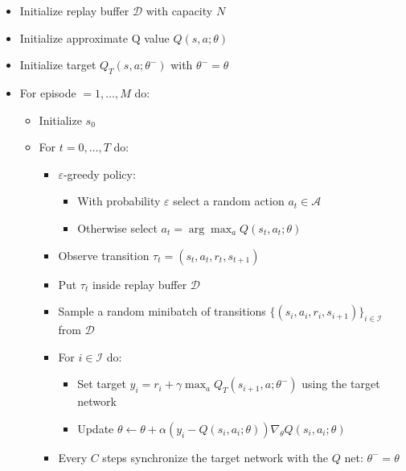 \documentclass[
]{book}
\providecommand{\tightlist}{%
  \setlength{\itemsep}{0pt}\setlength{\parskip}{0pt}}
\theoremstyle{definition}
\theoremstyle{definition}
\theoremstyle{definition}
\theoremstyle{definition}
\theoremstyle{remark}
\begin{document}
\begin{itemize}
\tightlist
\item
  Initialize replay buffer \(\mathcal{D}\) with capacity \(N\)
\item
  Initialize approximate Q value \(Q(s,a;\theta)\)
\item
  Initialize target \(Q_T(s,a;\theta^-)\) with \(\theta^- = \theta\)
\item
  For episode \(=1,\dots,M\) do:

  \begin{itemize}
  \tightlist
  \item
    Initialize \(s_0\)
  \item
    For \(t=0,\dots,T\) do:

    \begin{itemize}
    \tightlist
    \item
      \(\varepsilon\)-greedy policy:

      \begin{itemize}
      \tightlist
      \item
        With probability \(\varepsilon\) select a random action \(a_t \in \mathcal{A}\)
      \item
        Otherwise select \(a_t = \arg\max_a Q(s_t,a_t;\theta)\)
      \end{itemize}
    \item
      Observe transition \(\tau_t = (s_t, a_t, r_t, s_{t+1})\)
    \item
      Put \(\tau_t\) inside replay buffer \(\mathcal{D}\)
    \item
      Sample a random minibatch of transitions \(\{(s_i, a_i, r_i, s_{i+1})\}_{i \in \mathcal{I}}\) from \(\mathcal{D}\)
    \item
      For \(i \in \mathcal{I}\) do:

      \begin{itemize}
      \tightlist
      \item
        Set target \(y_i = r_i + \gamma \max_a Q_T(s_{i+1}, a; \theta^-)\) using the target network
      \item
        Update \(\theta \leftarrow \theta + \alpha (y_i - Q(s_i,a_i;\theta)) \nabla_\theta Q(s_i, a_i; \theta)\)
      \end{itemize}
    \item
      Every \(C\) steps synchronize the target network with the \(Q\) net: \(\theta^- = \theta\)
    \end{itemize}
  \end{itemize}
\end{itemize}
\end{document}
